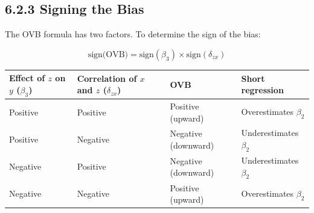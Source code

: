 \subsection{6.2.3 Signing the Bias}

The OVB formula has two factors. To determine the sign of the bias:

\[
\text{sign(OVB)} = \text{sign}(\beta_3) \times \text{sign}(\delta_{zx})
\]

\begin{center}
\begin{tabular}{@{} l l l l @{}}
\toprule
\textbf{Effect of $z$ on $y$ ($\beta_3$)} & \textbf{Correlation of $x$ and $z$ ($\delta_{zx}$)} & \textbf{OVB} & \textbf{Short regression} \\
\midrule
Positive & Positive & Positive (upward) & Overestimates $\beta_2$ \\
Positive & Negative & Negative (downward) & Underestimates $\beta_2$ \\
Negative & Positive & Negative (downward) & Underestimates $\beta_2$ \\
Negative & Negative & Positive (upward) & Overestimates $\beta_2$ \\
\bottomrule
\end{tabular}
\end{center}

